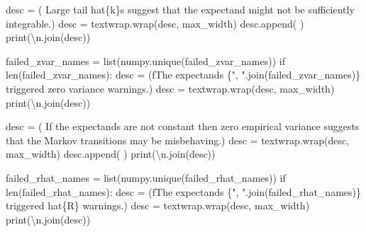 \documentclass[
  letterpaper,
  DIV=11,
  numbers=noendperiod]{scrartcl}
\newenvironment{Shaded}{\begin{snugshade}}{\end{snugshade}}
\newcommand{\BuiltInTok}[1]{\textcolor[rgb]{0.00,0.23,0.31}{#1}}
\newcommand{\CharTok}[1]{\textcolor[rgb]{0.13,0.47,0.30}{#1}}
\newcommand{\ControlFlowTok}[1]{\textcolor[rgb]{0.00,0.23,0.31}{#1}}
\newcommand{\NormalTok}[1]{\textcolor[rgb]{0.00,0.23,0.31}{#1}}
\newcommand{\OperatorTok}[1]{\textcolor[rgb]{0.37,0.37,0.37}{#1}}
\newcommand{\SpecialCharTok}[1]{\textcolor[rgb]{0.37,0.37,0.37}{#1}}
\newcommand{\SpecialStringTok}[1]{\textcolor[rgb]{0.13,0.47,0.30}{#1}}
\newcommand{\StringTok}[1]{\textcolor[rgb]{0.13,0.47,0.30}{#1}}
\begin{document}
\begin{Shaded}
\begin{Highlighting}[]
\NormalTok{    desc }\OperatorTok{=}\NormalTok{ (}\StringTok{\textquotesingle{}  Large tail hat}\SpecialCharTok{\{k\}}\StringTok{s suggest that the expectand \textquotesingle{}}
            \StringTok{\textquotesingle{}might not be sufficiently integrable.\textquotesingle{}}\NormalTok{)}
\NormalTok{    desc }\OperatorTok{=}\NormalTok{ textwrap.wrap(desc, max\_width)}
\NormalTok{    desc.append(}\StringTok{\textquotesingle{} \textquotesingle{}}\NormalTok{)}
    \BuiltInTok{print}\NormalTok{(}\StringTok{\textquotesingle{}}\CharTok{\textbackslash{}n}\StringTok{\textquotesingle{}}\NormalTok{.join(desc))}
  
\NormalTok{  failed\_zvar\_names }\OperatorTok{=} \BuiltInTok{list}\NormalTok{(numpy.unique(failed\_zvar\_names))}
  \ControlFlowTok{if} \BuiltInTok{len}\NormalTok{(failed\_zvar\_names):}
\NormalTok{    desc }\OperatorTok{=}\NormalTok{ (}\SpecialStringTok{f\textquotesingle{}The expectands }\SpecialCharTok{\{}\StringTok{", "}\SpecialCharTok{.}\NormalTok{join(failed\_zvar\_names)}\SpecialCharTok{\}}\SpecialStringTok{ \textquotesingle{}}
             \StringTok{\textquotesingle{}triggered zero variance warnings.\textquotesingle{}}\NormalTok{)}
\NormalTok{    desc }\OperatorTok{=}\NormalTok{ textwrap.wrap(desc, max\_width)}
    \BuiltInTok{print}\NormalTok{(}\StringTok{\textquotesingle{}}\CharTok{\textbackslash{}n}\StringTok{\textquotesingle{}}\NormalTok{.join(desc))}
    
\NormalTok{    desc }\OperatorTok{=}\NormalTok{ (}\StringTok{\textquotesingle{}  If the expectands are not constant then zero empirical\textquotesingle{}}
            \StringTok{\textquotesingle{} variance suggests that the Markov\textquotesingle{}}
            \StringTok{\textquotesingle{} transitions may be misbehaving.\textquotesingle{}}\NormalTok{)}
\NormalTok{    desc }\OperatorTok{=}\NormalTok{ textwrap.wrap(desc, max\_width)}
\NormalTok{    desc.append(}\StringTok{\textquotesingle{} \textquotesingle{}}\NormalTok{)}
    \BuiltInTok{print}\NormalTok{(}\StringTok{\textquotesingle{}}\CharTok{\textbackslash{}n}\StringTok{\textquotesingle{}}\NormalTok{.join(desc))}
      
\NormalTok{  failed\_rhat\_names }\OperatorTok{=} \BuiltInTok{list}\NormalTok{(numpy.unique(failed\_rhat\_names))}
  \ControlFlowTok{if} \BuiltInTok{len}\NormalTok{(failed\_rhat\_names):}
\NormalTok{    desc }\OperatorTok{=}\NormalTok{ (}\SpecialStringTok{f\textquotesingle{}The expectands }\SpecialCharTok{\{}\StringTok{", "}\SpecialCharTok{.}\NormalTok{join(failed\_rhat\_names)}\SpecialCharTok{\}}\SpecialStringTok{ \textquotesingle{}}
             \StringTok{\textquotesingle{}triggered hat}\SpecialCharTok{\{R\}}\StringTok{ warnings.\textquotesingle{}}\NormalTok{)}
\NormalTok{    desc }\OperatorTok{=}\NormalTok{ textwrap.wrap(desc, max\_width)}
    \BuiltInTok{print}\NormalTok{(}\StringTok{\textquotesingle{}}\CharTok{\textbackslash{}n}\StringTok{\textquotesingle{}}\NormalTok{.join(desc))}
    

\end{Highlighting}
\end{Shaded}
\end{document}
